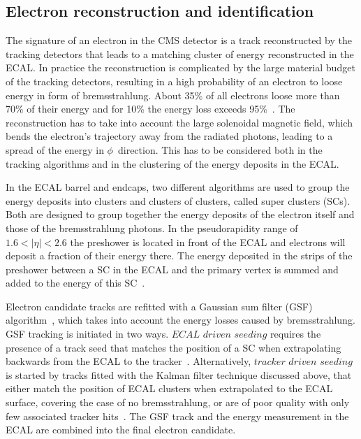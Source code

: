 \subsection{Electron reconstruction and identification}
The signature of an electron in the CMS detector is a track reconstructed by the tracking detectors that leads to a matching cluster of energy reconstructed in the ECAL. In practice the reconstruction is complicated by the large material budget of the tracking detectors, resulting in a high probability of an electron to loose energy in form of bremsstrahlung. About 35\% of all electrons loose more than 70\% of their energy and for 10\% the energy loss exceeds 95\%~\cite{Baffioni:2006cd}. The reconstruction has to take into account the large solenoidal magnetic field, which bends the electron's trajectory away from the radiated photons, leading to a spread of the energy in $\phi$~direction. This has to be considered both in the tracking algorithms and in the clustering of the energy deposits in the ECAL. 

In the ECAL barrel and endcaps, two different algorithms are used to group the energy deposits into clusters and clusters of clusters, called super clusters (SCs). Both are designed to group together the energy deposits of the electron itself and those of the bremsstrahlung photons. In the pseudorapidity range of $1.6 < |\eta| < 2.6$ the preshower is located in front of the ECAL and electrons will deposit a fraction of their energy there. The energy deposited in the strips of the preshower between a SC in the ECAL and the primary vertex is summed and added to the energy of this SC~\cite{Anderson:1365024}. 

Electron candidate tracks are refitted with a Gaussian sum filter (GSF) algorithm~\cite{FruhwirtGSFCMS}, which takes into account the energy losses caused by bremsstrahlung. GSF tracking is initiated in two ways. $\textit{ECAL driven seeding}$ requires the presence of a track seed that matches the position of a SC when extrapolating backwards from the ECAL to the tracker~\cite{Baffioni:2006cd}. Alternatively, $\textit{tracker driven seeding}$ is started by tracks fitted with the Kalman filter technique discussed above, that either match the position of ECAL clusters when extrapolated to the ECAL surface, covering the case of no bremsstrahlung, or are of poor quality with only few associated tracker hits~\cite{Chatrchyan:2014fea}. The GSF track and the energy measurement in the ECAL are combined into the final electron candidate. 

